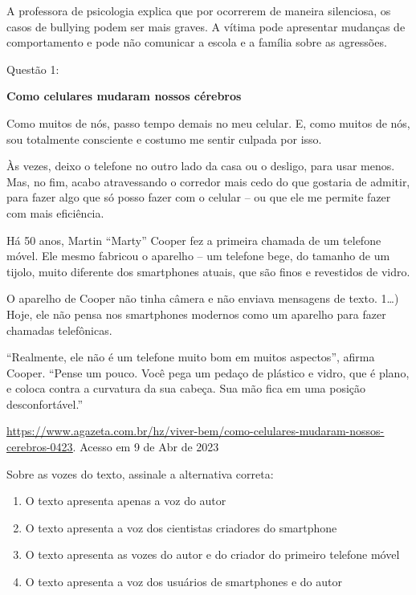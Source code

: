 A professora de psicologia explica que por ocorrerem de maneira
silenciosa, os casos de bullying podem ser mais graves. A vítima pode
apresentar mudanças de comportamento e pode não comunicar a escola e a
família sobre as agressões.


Questão 1:

\textbf{Como celulares mudaram nossos cérebros}

Como muitos de nós, passo tempo demais no meu celular. E, como muitos de
nós, sou totalmente consciente e costumo me sentir culpada por isso.

Às vezes, deixo o telefone no outro lado da casa ou o desligo, para usar
menos. Mas, no fim, acabo atravessando o corredor mais cedo do que
gostaria de admitir, para fazer algo que só posso fazer com o celular --
ou que ele me permite fazer com mais eficiência.

Há 50 anos, Martin ``Marty'' Cooper fez a primeira chamada de um
telefone móvel. Ele mesmo fabricou o aparelho -- um telefone bege, do
tamanho de um tijolo, muito diferente dos smartphones atuais, que são
finos e revestidos de vidro.

O aparelho de Cooper não tinha câmera e não enviava mensagens de texto.
1\ldots) Hoje, ele não pensa nos smartphones modernos como um aparelho
para fazer chamadas telefônicas.

``Realmente, ele não é um telefone muito bom em muitos aspectos'',
afirma Cooper. ``Pense um pouco. Você pega um pedaço de plástico e
vidro, que é plano, e coloca contra a curvatura da sua cabeça. Sua mão
fica em uma posição desconfortável.''

\href{https://www.agazeta.com.br/hz/viver-bem/como-celulares-mudaram-nossos-cerebros-0423}{\uline{https://www.agazeta.com.br/hz/viver-bem/como-celulares-mudaram-nossos-cerebros-0423}}.
Acesso em 9 de Abr de 2023

Sobre as vozes do texto, assinale a alternativa correta:

\begin{enumerate}
\def\labelenumi{\alph{enumi})}
\item
  O texto apresenta apenas a voz do autor
\item
  O texto apresenta a voz dos cientistas criadores do smartphone
\item
  O texto apresenta as vozes do autor e do criador do primeiro telefone
  móvel
\item
  O texto apresenta a voz dos usuários de smartphones e do autor
\end{enumerate}

